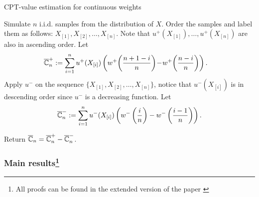 \begin{algorithm}
\caption{CPT-value estimation for \holder continuous weights}
\label{alg:holder-est}
\begin{algorithmic}[1]
\State Simulate $n$ i.i.d. samples from the distribution of $X$.
\State Order the samples and label them as follows: 
$X_{[1]}, X_{[2]}, \ldots ,X_{[n]}$. Note that $u^+(X_{[1]}),\ldots ,u^+(X_{[n]})$ are also in ascending order.
\State Let
\vspace{-0.5ex}
$$\hspace{-1.1em}\overline \C_n^+:=\sum_{i=1}^{n} u^+(X_{[i]}) \left(w^+\!\left(\frac{n+1-i}{n}\right)\!-\! w^+\!\left(\frac{n-i}{n}\right) \right).$$
\vspace{-0.5ex}
\State Apply $u^{-}$ on the sequence $\{X_{[1]}, X_{[2]}, \ldots ,X_{[n]}\}$, notice that $u^{-}(X_{[i]})$ is in descending order since $u^{-}$ is a decreasing function.     
\State Let
\vspace{-0.5ex}
$$\overline {\mathbb{C}}_n^-:=\sum_{i=1}^{n} u^-(X_{[i]}) \left(w^-\left(\frac{i}{n}\right)- w^-\left(\frac{i-1}{n}\right) \right). $$

\vspace{-0.5ex}
\State Return $\overline {\mathbb{C}}_n =\overline {\mathbb{C}}_n^+ - \overline {\mathbb{C}}_n^-$.
\end{algorithmic}
\end{algorithm}

\subsubsection*{Main results\footnote{All proofs can be found in the extended version of the paper \cite{Pracheng2015cpt}}}

